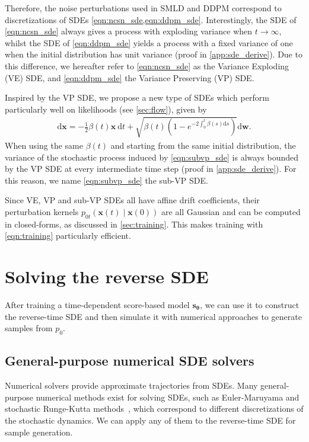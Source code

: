 \documentclass{article} %
\newcommand{\ud}{\mathrm{d}}
\newcommand{\bfx}{\mathbf{x}}
\newcommand{\bfw}{\mathbf{w}}
\newcommand{\bftheta}{{\boldsymbol{\theta}}}
\newcommand{\bfs}{\mathbf{s}}
\begin{document}
Therefore, the noise perturbations used in SMLD and DDPM correspond to discretizations of SDEs \cref{eqn:ncsn_sde,eqn:ddpm_sde}. Interestingly, the SDE of \cref{eqn:ncsn_sde} always gives a process with exploding variance when $t \to \infty$, whilst the SDE of \cref{eqn:ddpm_sde} yields a process with a fixed variance of one when the initial distribution has unit variance (proof in \cref{app:sde_derive}). Due to this difference, we hereafter refer to \cref{eqn:ncsn_sde} as the Variance Exploding (VE) SDE, and \cref{eqn:ddpm_sde} the Variance Preserving (VP) SDE. 

Inspired by the VP SDE, we propose a new type of SDEs which perform particularly well on likelihoods (see \cref{sec:flow}), given by
\begin{align}
    \ud \bfx = -\frac{1}{2}\beta(t) \bfx~ \ud t + \sqrt{\beta(t)(1 - e^{-2\int_0^t \beta(s)\ud s})} \ud \bfw.\label{eqn:subvp_sde}
\end{align}
When using the same $\beta(t)$ and starting from the same initial distribution, the variance of the stochastic process induced by \cref{eqn:subvp_sde} is always bounded by the VP SDE at every intermediate time step (proof in \cref{app:sde_derive}). For this reason, we name \cref{eqn:subvp_sde} the sub-VP SDE.

Since VE, VP and sub-VP SDEs all have affine drift coefficients, their perturbation kernels $p_{0t}(\bfx(t) \mid \bfx(0))$ are all Gaussian and can be computed in closed-forms, as discussed in \cref{sec:training}. This makes training with \cref{eqn:training} particularly efficient. 








\section{Solving the reverse SDE}
After training a time-dependent score-based model $\bfs_\bftheta$, we can use it to construct the reverse-time SDE and then simulate it with numerical approaches to generate samples from $p_0$. %

\subsection{General-purpose numerical SDE solvers}

Numerical solvers provide approximate trajectories from SDEs. Many general-purpose numerical methods exist for solving SDEs, such as Euler-Maruyama and stochastic Runge-Kutta methods~\citep{kloeden2013numerical}, which correspond to different discretizations of the stochastic dynamics. We can apply any of them to the reverse-time SDE for sample generation. %
\end{document}
